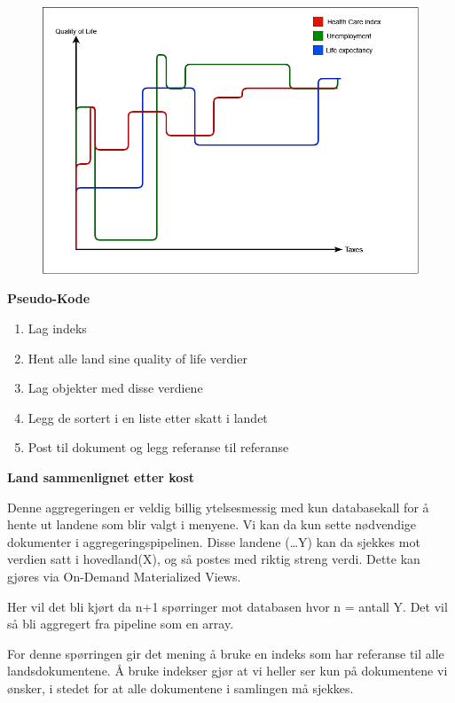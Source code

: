 \FigureCounter
\begin{figure}[H]
  \includegraphics[scale=0.5]{images/milepael3/qualityOfLifeByTaxes.png}
\end{figure}

\textbf{Pseudo-Kode}
\begin{enumerate}
  \item Lag indeks
  \item Hent alle land sine quality of life verdier
  \item Lag objekter med disse verdiene
  \item Legg de sortert i en liste etter skatt i landet
  \item Post til dokument og legg referanse til referanse
\end{enumerate}

\textbf{Land sammenlignet etter kost}

Denne aggregeringen er veldig billig ytelsesmessig med kun databasekall for å hente ut landene som blir valgt i menyene. Vi kan da kun sette nødvendige dokumenter i aggregeringspipelinen. Disse landene (…Y) kan da sjekkes mot verdien satt i hovedland(X), og så postes med riktig streng verdi. Dette kan gjøres via On-Demand Materialized Views.

Her vil det bli kjørt da n+1 spørringer mot databasen hvor n = antall Y. Det vil så bli aggregert fra pipeline som en array.

For denne spørringen gir det mening å bruke en indeks som har referanse til alle landsdokumentene. Å bruke indekser gjør at vi heller ser kun på dokumentene vi ønsker, i stedet for at alle dokumentene i samlingen må sjekkes.

